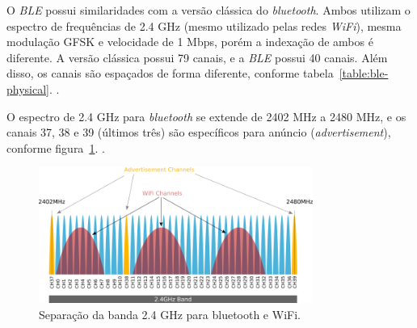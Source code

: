 \documentclass[
		12pt,				%
		openright,			%
		oneside,			%
		a4paper,			%
		chapter=TITLE,		%
		english,			%
		brazil				%
	]{abntex2}
\begin{document}
O \textit{BLE} possui similaridades com a versão clássica do \textit{bluetooth}. Ambos utilizam o espectro de frequências de 2.4 GHz (mesmo utilizado pelas redes \textit{WiFi}), mesma modulação GFSK e velocidade de 1 Mbps, porém a indexação de ambos é diferente. A versão clássica possui 79 canais, e a \textit{BLE} possui 40 canais. Além disso, os canais são espaçados de forma diferente, conforme tabela~\ref{table:ble-physical}. \cite{ble-packets}.

\begin{table}[htb]
\end{table}

O espectro de 2.4 GHz para \textit{bluetooth} se extende de 2402 MHz a 2480 MHz, e os canais 37, 38 e 39 (últimos três) são específicos para anúncio (\textit{advertisement}), conforme figura~\ref{fig:banda-channels}.  \cite{ble-packets}. 

\begin{figure}[htb]
	\caption{\label{fig:banda-channels}Separação da banda 2.4 GHz para bluetooth e WiFi.}
	\begin{center}
		\includegraphics[width=0.8\textwidth]{img/banda-2-4.png}
	\end{center}
\end{figure}
\end{document}
